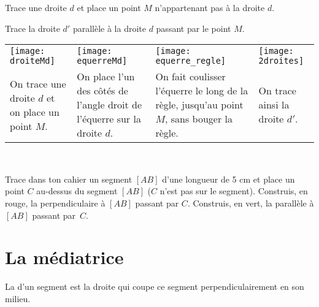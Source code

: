 \begin{methode*1}

\begin{exemple*1}
Trace une droite $d$ et place un point $M$ n'appartenant pas à la droite $d$.

Trace la droite $d'$ parallèle à la droite $d$ passant par le point $M$. \\[0.75em]

\begin{tabularx}{\textwidth}{X|X|X|X}
 \texttt{[image: droiteMd]} &  \texttt{[image: equerreMd]} & \texttt{[image: equerre\_regle]} &  \texttt{[image: 2droites]}\\ 
On trace une droite $d$ et on place un point $M$. & On place l'un des côtés de l'angle droit de l'équerre sur la droite $d$. & On fait coulisser l'équerre le long de la règle, jusqu'au point $M$, sans bouger la règle. & On trace ainsi la droite $d'$.\\
\end{tabularx} \\
 
 \end{exemple*1}

\exercice 
Trace dans ton cahier un segment $[AB]$ d'une longueur de 5 cm et place un point $C$ au-dessus du segment $[AB]$ ($C$ n'est pas sur le segment). Construis, en rouge, la perpendiculaire à $[AB]$ passant par $C$. Construis, en vert, la parallèle à $[AB]$ passant par $C$.

\end{methode*1}

\newpage

\section{La médiatrice}

\begin{definition}
La \textbf{} d'un segment est la droite qui coupe ce segment perpendiculairement en son milieu.
\end{definition}


